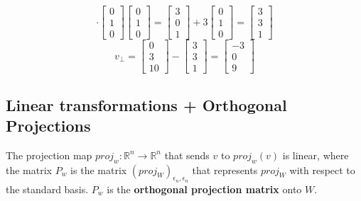 \begin{enumerate}
\[{  \cdot \begin{bmatrix} 0 \\ 1 \\ 0 \end{bmatrix}} \begin{bmatrix} 0 \\ 1 \\ 0 \end{bmatrix} = \begin{bmatrix}3 \\ 0 \\ 1\end{bmatrix} + 
  3 \begin{bmatrix} 0 \\ 1 \\ 0 \end{bmatrix} = \begin{bmatrix}
3 \\ 3 \\ 1 \end{bmatrix}
  \]
\[
  v_\perp = \begin{bmatrix} 0 \\ 3 \\ 10 \end{bmatrix} - 
  \begin{bmatrix} 3 \\ 3 \\ 1 \end{bmatrix} = \begin{bmatrix}
-3 \\ 0 \\ 9 \end{bmatrix}
\]
\subsection{Linear transformations + Orthogonal Projections}
The projection map $proj_w : \mathbb{R}^n \rightarrow \mathbb{R}^n$ 
that sends $v$ to $proj_w(v)$ is linear, where the matrix $P_w$ 
is the matrix $(proj_W)_{\epsilon_n, \epsilon_n}$ that represents 
$proj_W$ with respect to the standard basis. $P_w$ is the \textbf{orthogonal projection matrix} onto $W$. 

\end{enumerate}
